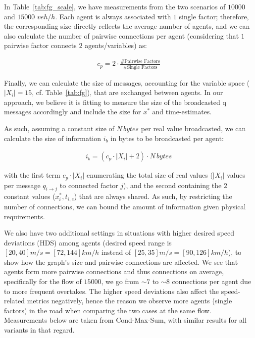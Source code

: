 In Table~\ref{tab:fg_scale}, we have measurements from the two scenarios of $10000$ and $15000$ $veh/h$.
Each agent is always associated with $1$ single factor; therefore, the corresponding size directly reflects the average number of agents, and we can also calculate the number of pairwise connections per agent (considering that $1$ pairwise factor connects $2$ agents/variables) as:

%
\begin{eqnarray}
    c_p = 2\cdot\frac{\#\text{Pairwise Factors}}{\#\text{Single Factors}}
\end{eqnarray}
%


Finally, we can calculate the size of messages, accounting for the variable space 
($|X_i|=15$, cf. Table~\ref{tab:fg}), that are exchanged between agents. In our approach, we believe it is fitting to measure the size of the broadcasted q messages accordingly and include the size for $x^*$ and time-estimates. 

As such, assuming a constant size of $N\, bytes$ per real value broadcasted, we can calculate the size of information $i_b$ in bytes to be broadcasted per agent:

%
\begin{eqnarray}
    i_b = (c_p \cdot |X_i| + 2)\cdot N\, bytes
\end{eqnarray}
%

\noindent with the first term $c_p \cdot |X_i|$ enumerating the total size of real values ($|X_i|$ values per message $q_{i\rightarrow j}$ to connected factor $j$), and the second containing the $2$ constant values ($x^*_i,t_{i,e}$) that are always shared.
As such, by restricting the number of connections, we can bound the amount of information given physical requirements. 

We also have two additional settings in situations with higher desired speed deviations (HDS) among agents (desired speed range is $[20,40] m/s=[72,144]km/h$ instead of $[25,35]m/s=[90,126]km/h$), to show how the graph’s size and pairwise connections are affected. We see that agents form more pairwise connections and thus connections on average, specifically for the flow of $15000$, we go from $\sim 7$ to $\sim 8$ connections per agent  due to more frequent overtakes. 
The higher speed deviations also affect the speed-related metrics negatively, hence the reason we observe more agents (single factors) in the road when comparing the two cases at the same flow.
Measurements below are taken from Cond-Max-Sum, with similar results for all variants in that regard.


